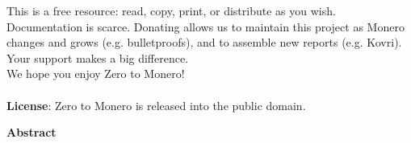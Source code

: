 \documentclass[usletter,11pt,english,oneside,onecolumn,final,openany]{report}
\begin{document}
\begin{center}
  \begin{minipage}[t]{6.43in}
This is a free resource: read, copy, print, or distribute as you wish.\\

Documentation is scarce. Donating allows us to maintain this project as Monero changes and grows (e.g. bulletproofs), and to assemble new reports (e.g. Kovri). Your support makes a big difference.\\

We hope you enjoy Zero to Monero!\vspace{.33cm}\\
\newlength\stextwidth
{}
\vspace{-.45cm}
\makebox[\textwidth][c]{\rule{\stextwidth}{.4pt}}\vspace{-.15cm}
\vspace{-.35cm}
\makebox[\textwidth][c]{\rule{\stextwidth}{.4pt}}
\vspace{.117cm}\\
\textbf{License}: Zero to Monero is released into the public domain.
  
  \end{minipage}
\end{center}
\vspace{0cm}

\newpage
\pagestyle{empty}
\begin{center}
\vspace*{\fill}%
{\LARGE \bfseries  Abstract}
\end{center}
\vspace{0.5cm}
\begin{center} 
\begin{minipage}{5.5in}
\begin{center} \vrule width 4.5in height 0.4pt \end{center} 
\parindent=0pt 

\begin{center} \vrule width 4.5in height 0.4pt \end{center} 
\end{minipage} 
\vspace*{\fill}
\end{center}
\end{document}
